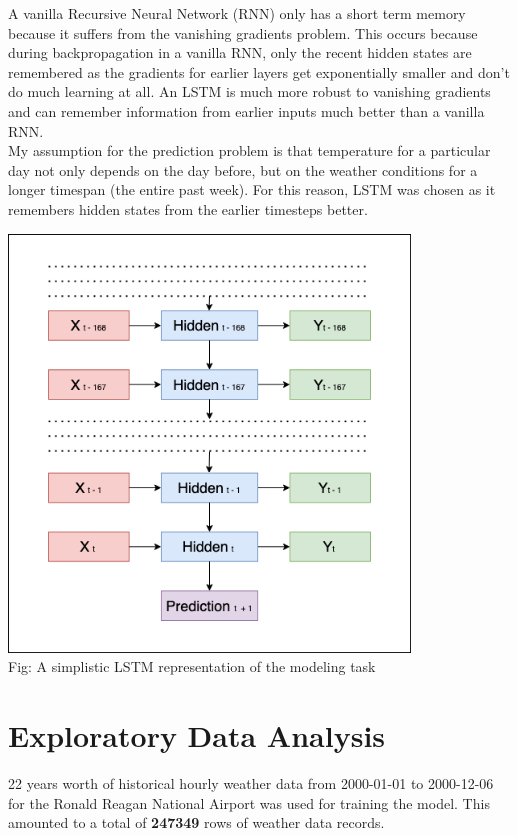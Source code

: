 \documentclass[paper=a4, fontsize=11pt, margin=1in]{scrartcl}
\numberwithin{equation}{section}		%
\numberwithin{figure}{section}			%
\numberwithin{table}{section}				%
\begin{document}
A vanilla Recursive Neural Network (RNN) only has a short term memory because it suffers from the vanishing gradients problem. This occurs because during backpropagation in a vanilla RNN, only the recent hidden states are remembered as the gradients for earlier layers get exponentially smaller and don't do much learning at all. An LSTM is much more robust to vanishing gradients and can remember information from earlier inputs much better than a vanilla RNN. \\

My assumption for the prediction problem is that temperature for a particular day not only depends on the day before, but on the weather conditions for a longer timespan (the entire past week). For this reason, LSTM was chosen as it remembers hidden states from the earlier timesteps better.\\

\begin{center}
\includegraphics[width=0.8\textwidth,height=0.5\textheight]{lstm.png}
\\
Fig: A simplistic LSTM representation of the modeling task
\end{center}


\section{\textbf{Exploratory Data Analysis}}

22 years worth of historical hourly weather data from 2000-01-01 to 2000-12-06 for the Ronald Reagan National Airport was used for training the model. This amounted to a total of \textbf{247349} rows of weather data records.\\
\end{document}
